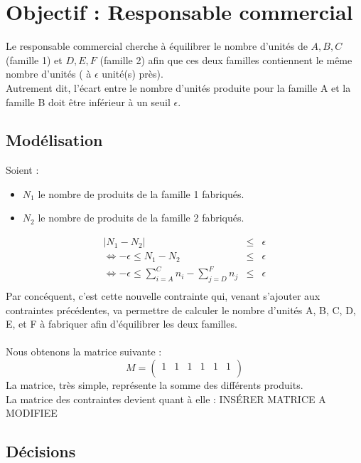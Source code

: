 \newpage
\section{Objectif : Responsable commercial}
Le responsable commercial cherche à équilibrer le nombre
d'unités de ${A, B, C}$ (famille 1) et ${D, E, F}$ (famille 2) afin que ces deux
familles contiennent le même nombre d'unités ( à $\epsilon$
unité(s) près).\\
Autrement dit, l'écart entre le nombre d'unités produite pour la famille A et la famille B doit être inférieur à un seuil $\epsilon$.

\subsection{Modélisation}
Soient :
\begin{itemize}
  \item $N_1$ le nombre de produits de la famille 1 fabriqués.
  \item $N_2$ le nombre de produits de la famille 2 fabriqués.
\end{itemize}

\begin{eqnarray*}
	|N_1 - N_2| &\leq& \epsilon\\
	\Leftrightarrow -\epsilon \leq N_1 - N_2 &\leq& \epsilon\\
	\Leftrightarrow -\epsilon \leq \sum_{i = A}^{C} n_i - \sum_{j = D}^{F} n_j
	&\leq& \epsilon\\
\end{eqnarray*} 
Par concéquent, c'est cette nouvelle contrainte qui, venant s'ajouter aux
contraintes précédentes, va permettre de calculer le nombre d'unités A, B, C,
D, E, et F à fabriquer afin d'équilibrer les deux familles.\\
~\\
Nous obtenons la matrice suivante :
\begin{displaymath}
M = \left(
\begin{array}{cccccc}
1 & 1 & 1 & 1 & 1 & 1\\
\end{array}
\right)
\end{displaymath}
La matrice, très simple, représente la somme des différents produits.\\
La matrice des contraintes devient quant à elle :
INSÉRER MATRICE A MODIFIEE

\subsection{Décisions}

